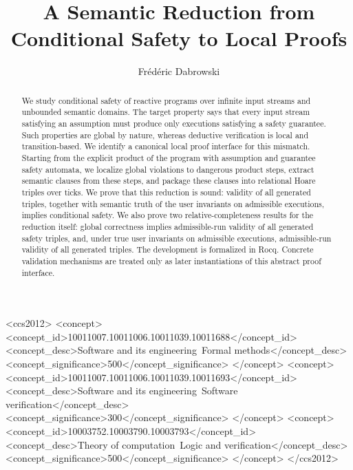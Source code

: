 \documentclass[acmsmall,screen]{acmart}
\title{A Semantic Reduction from Conditional Safety to Local Proofs}
\author{Fr\'ed\'eric Dabrowski}
\affiliation{%
  \institution{Univ.Orl\'eans, INSA Centre Val de Loire, LIFO EA 4022}
  \city{Orl\'eans}
  \country{France}
}
\theoremstyle{leftplain}
\theoremstyle{leftdefinition}
\theoremstyle{leftremark}
\begin{document}
\begin{abstract}
We study conditional safety of reactive programs over infinite input streams and
unbounded semantic domains. The target property says that every input stream
satisfying an assumption must produce only executions satisfying a safety
guarantee. Such properties are global by nature, whereas deductive
verification is local and transition-based. We identify a canonical local proof
interface for this mismatch. Starting from the explicit product of the program
with assumption and guarantee safety automata, we localize global violations to
dangerous product steps, extract semantic clauses from these steps, and package
these clauses into relational Hoare triples over ticks. We prove that this
reduction is sound: validity of all generated triples, together with semantic
truth of the user invariants on admissible executions, implies conditional
safety. We also prove two relative-completeness results for the reduction
itself: global correctness implies admissible-run validity of all generated
safety triples, and, under true user invariants on admissible executions,
admissible-run validity of all generated triples. The
development is formalized in Rocq. Concrete validation mechanisms are treated
only as later instantiations of this abstract proof interface.
\end{abstract}

\begin{CCSXML}
<ccs2012>
<concept>
<concept_id>10011007.10011006.10011039.10011688</concept_id>
<concept_desc>Software and its engineering~Formal methods</concept_desc>
<concept_significance>500</concept_significance>
</concept>
<concept>
<concept_id>10011007.10011006.10011039.10011693</concept_id>
<concept_desc>Software and its engineering~Software verification</concept_desc>
<concept_significance>300</concept_significance>
</concept>
<concept>
<concept_id>10003752.10003790.10003793</concept_id>
<concept_desc>Theory of computation~Logic and verification</concept_desc>
<concept_significance>500</concept_significance>
</concept>
</ccs2012>
\end{CCSXML}



\maketitle
\end{document}

